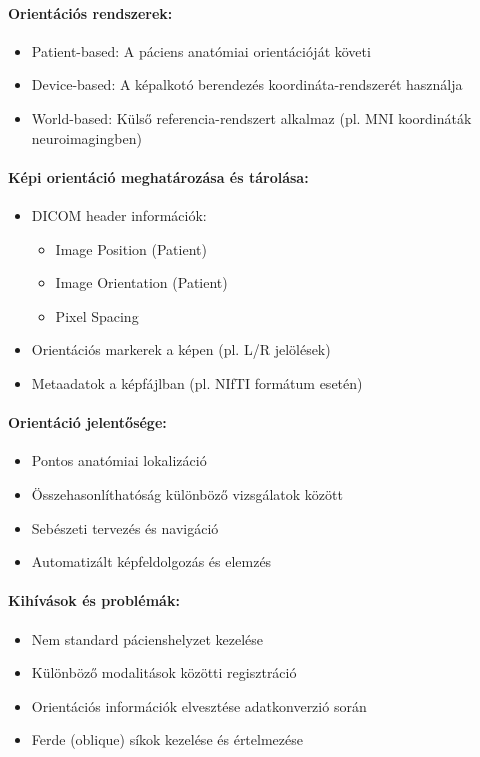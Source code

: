 \documentclass[a4paper,12pt]{article}
\begin{document}
\paragraph{Orientációs rendszerek:} \begin{itemize} \item Patient-based: A páciens anatómiai orientációját követi \item Device-based: A képalkotó berendezés koordináta-rendszerét használja \item World-based: Külső referencia-rendszert alkalmaz (pl. MNI koordináták neuroimagingben) \end{itemize}

\paragraph{Képi orientáció meghatározása és tárolása:} \begin{itemize} \item DICOM header információk: \begin{itemize} \item Image Position (Patient) \item Image Orientation (Patient) \item Pixel Spacing \end{itemize} \item Orientációs markerek a képen (pl. L/R jelölések) \item Metaadatok a képfájlban (pl. NIfTI formátum esetén) \end{itemize}

\paragraph{Orientáció jelentősége:} \begin{itemize} \item Pontos anatómiai lokalizáció \item Összehasonlíthatóság különböző vizsgálatok között \item Sebészeti tervezés és navigáció \item Automatizált képfeldolgozás és elemzés \end{itemize}

\paragraph{Kihívások és problémák:} \begin{itemize} \item Nem standard pácienshelyzet kezelése \item Különböző modalitások közötti regisztráció \item Orientációs információk elvesztése adatkonverzió során \item Ferde (oblique) síkok kezelése és értelmezése \end{itemize}
\end{document}
